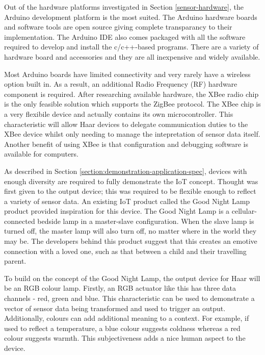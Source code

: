         Out of the hardware platforms investigated in Section \ref{sensor-hardware}, the Arduino development platform is the most suited. The Arduino hardware boards and software tools are open source giving complete transparancy to their implementation. The Arduino IDE also comes packaged with all the software required to develop and install the c/c++-based programs. There are a variety of hardware board and accessories and they are all inexpensive and widely available.

        Most Arduino boards have limited connectivity and very rarely have a wireless option built in. As a result, an additional Radio Frequency (RF) hardware component is required. After researching available hardware, the XBee radio chip is the only feasible solution which supports the ZigBee protocol. The XBee chip is a very flexibile device and actually contains its own microcontroller. This characteristic will allow Haar devices to delegate communication duties to the XBee device whilst only needing to manage the intepretation of sensor data itself. Another benefit of using XBee is that configuration and debugging software is available for computers.

        As described in Section \ref{section:demonstration-application-spec}, devices with enough diversity are required to fully demonstrate the IoT concept. Thought was first given to the output device; this was required to be flexible enough to reflect a variety of sensor data. An existing IoT product called the Good Night Lamp product provided inspiration for this device. The Good Night Lamp is a cellular-connected bedside lamp in a master-slave configuration. When the slave lamp is turned off, the master lamp will also turn off, no matter where in the world they may be. The developers behind this product suggest that this creates an emotive connection with a loved one, such as that between a child and their travelling parent.

        To build on the concept of the Good Night Lamp, the output device for Haar will be an RGB colour lamp. Firstly, an RGB actuator like this has three data channels - red, green and blue. This characteristic can be used to demonstrate a vector of sensor data being transformed and used to trigger an output. Additionally, colours can add additional meaning to a context. For example, if used to reflect a temperature, a blue colour suggests coldness whereas a red colour suggests warmth. This subjectiveness adds a nice human aspect to the device.

